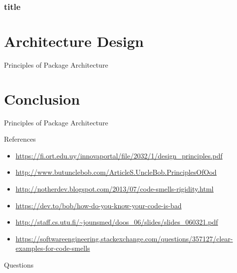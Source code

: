 \documentclass[xcolor=svgnames]{beamer}
\begin{document}

\begin{frame}[t]\frametitle{title}



\end{frame}

\section{Architecture Design}


\begin{frame}{Principles of Package Architecture}
\end{frame}

\section{Conclusion}

\begin{frame}{Principles of Package Architecture}
\end{frame}


\begin{frame}{References}
    \begin{itemize}
        \item \url{https://fi.ort.edu.uy/innovaportal/file/2032/1/design_principles.pdf}
        \item \url{http://www.butunclebob.com/ArticleS.UncleBob.PrinciplesOfOod}
        \item \url{http://notherdev.blogspot.com/2013/07/code-smells-rigidity.html}
        \item \url{https://dev.to/bob/how-do-you-know-your-code-is-bad}
        \item \url{http://staff.cs.utu.fi/~jounsmed/doos_06/slides/slides_060321.pdf}
        \item \url{https://softwareengineering.stackexchange.com/questions/357127/clear-examples-for-code-smells}
    \end{itemize}
\end{frame}


\begin{frame}{Questions}

\end{frame}
\end{document}

